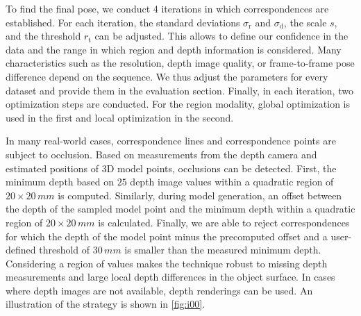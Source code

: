 \documentclass[10pt,twocolumn,letterpaper]{article}
\begin{document}
To find the final pose, we conduct 4 iterations in which correspondences are established.
For each iteration, the standard deviations $\sigma_\textrm{r}$ and $\sigma_\textrm{d}$, the scale $s$, and the threshold $r_\textrm{t}$ can be adjusted.
This allows to define our confidence in the data and the range in which region and depth information is considered.
Many characteristics such as the resolution, depth image quality, or frame-to-frame pose difference depend on the sequence.
We thus adjust the parameters for every dataset and provide them in the evaluation section.
Finally, in each iteration, two optimization steps are conducted.
For the region modality, global optimization is used in the first and local optimization in the second.

In many real-world cases, correspondence lines and correspondence points are subject to occlusion.
Based on measurements from the depth camera and estimated positions of 3D model points, occlusions can be detected.
First, the minimum depth based on $25$ depth image values within a quadratic region of $20\times20\,\unit{mm}$ is computed.
Similarly, during model generation, an offset between the depth of the sampled model point and the minimum depth within a quadratic region of $20\times20\,\unit{mm}$ is calculated.
Finally, we are able to reject correspondences for which the depth of the model point minus the precomputed offset and a user-defined threshold of $30\,\unit{mm}$ is smaller than the measured minimum depth.
Considering a region of values makes the technique robust to missing depth measurements and large local depth differences in the object surface.
In cases where depth images are not available, depth renderings can be used.
An illustration of the strategy is shown in \cref{fig:i00}.
\end{document}
